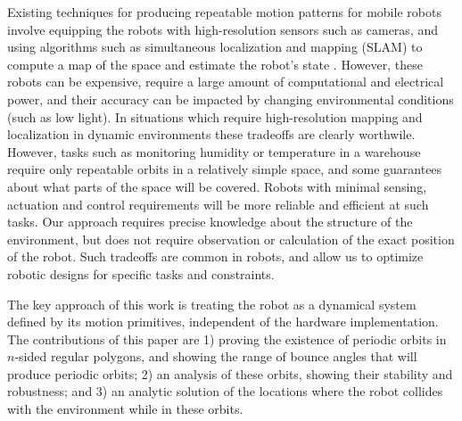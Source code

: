 \documentclass[letterpaper, 10 pt, conference]{ieeeconf}  %
\begin{document}
Existing techniques for producing repeatable motion patterns for mobile robots
involve equipping the robots with high-resolution sensors such as cameras, and
using algorithms such as simultaneous localization and mapping (SLAM) to compute
a map of the space and estimate the robot's state
\cite{slamSolution,fastslam,durrant2006}. However, these robots can be
expensive, require a large amount of computational and electrical power, and
their accuracy can be impacted by changing environmental conditions (such as low
light). In situations which require high-resolution mapping and localization in
dynamic environments these tradeoffs are clearly worthwile. However,
tasks such as monitoring humidity or temperature in a warehouse require only
repeatable orbits in a relatively simple space, and some guarantees about what parts of the space
will be covered. Robots with minimal sensing, actuation and control requirements
will be more reliable and efficient at such tasks. Our approach requires 
precise knowledge about the structure of the environment, but does not require
observation or calculation of the exact position of the robot. Such tradeoffs
are common in robots, and allow us to optimize robotic designs for specific
tasks and constraints.

The key approach of this work is treating the robot
as a dynamical system defined
by its motion primitives, independent of the hardware implementation.
The contributions of this paper are 1) proving the existence of
periodic orbits in $n$-sided regular polygons, and showing the range of bounce
angles that will produce periodic orbits;
2) an analysis of these orbits, showing their stability and robustness; and 3) 
an analytic solution of the locations where the robot collides with the
environment while in these orbits.
\end{document}
